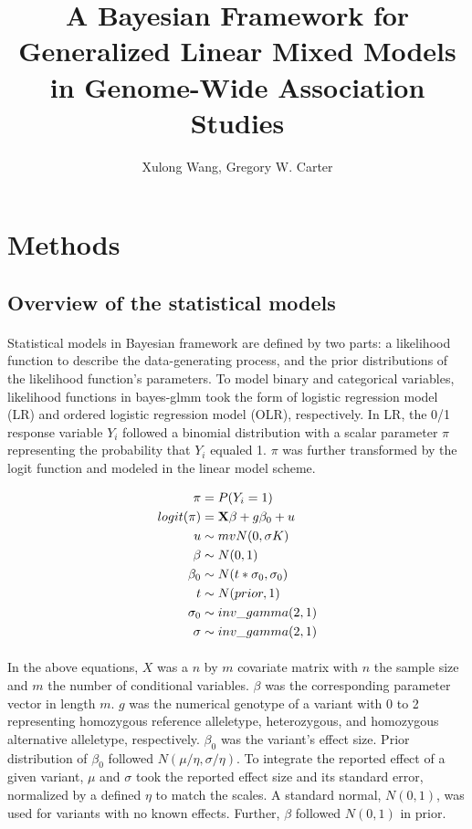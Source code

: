 \documentclass[12pt]{article}
\title{A Bayesian Framework for Generalized Linear Mixed Models in Genome-Wide Association Studies}
\author{Xulong Wang, Gregory W. Carter}
\begin{document}
\maketitle

\section*{Methods}
\subsection*{Overview of the statistical models}

\paragraph{}{
Statistical models in Bayesian framework are defined by two parts: a likelihood function to describe the data-generating process, and the prior distributions of the likelihood function's parameters. To model binary and categorical variables, likelihood functions in bayes-glmm took the form of logistic regression model (LR) and ordered logistic regression model (OLR), respectively. In LR, the 0/1 response variable $Y_i$ followed a binomial distribution with a scalar parameter $\pi$ representing the probability that $Y_i$ equaled 1. $\pi$ was further transformed by the logit function and modeled in the linear model scheme. 
}

\begin{align}
   \pi & = P(Y_i = 1) \\
   logit(\pi) & = \bold{X} \beta + g \beta_0 + u \\
    u & \sim mvN(0, \sigma K) \\
   \beta & \sim N(0, 1) \\
   \beta_0 & \sim N( t * \sigma_0, \sigma_0) \\
   t & \sim N(prior, 1) \\
   \sigma_0 & \sim inv\_gamma(2, 1) \\ 
   \sigma & \sim inv\_gamma(2, 1)
\end{align}

\paragraph{}{
In the above equations, $X$ was a $n$ by $m$ covariate matrix with $n$ the sample size and $m$ the number of conditional variables. $\beta$ was the corresponding parameter vector in length $m$. $g$ was the numerical genotype of a variant with 0 to 2 representing homozygous reference alleletype, heterozygous, and homozygous alternative alleletype, respectively. $\beta_0$ was the variant's effect size. Prior distribution of $\beta_0$ followed $N(\mu / \eta, \sigma / \eta)$. To integrate the reported effect of a given variant, $\mu$ and $\sigma$ took the reported effect size and its standard error, normalized by a defined $\eta$ to match the scales. A standard normal, $N(0, 1)$, was used for variants with no known effects. Further, $\beta$ followed $N(0, 1)$ in prior.
}
\end{document}
